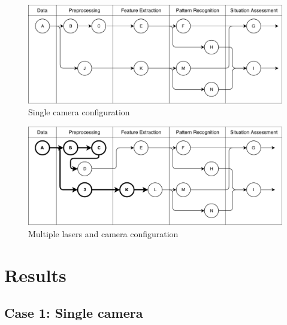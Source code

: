 \begin{figure}[ht!]
\centering
\includegraphics[scale=0.7]{fig/4/test_configuration1.pdf}
\caption{Single camera configuration}
\label{tconf1}
\end{figure}

\begin{figure}[ht!]
\centering
\includegraphics[scale=0.7]{fig/4/test_configuration2.pdf}
\caption{Multiple lasers and camera configuration}
\label{tconf2}
\end{figure}


%


\section{Results}

\subsection{Case 1: Single camera}

